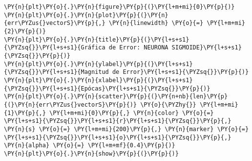     \begin{tcolorbox}[breakable, size=fbox, boxrule=1pt, pad at break*=1mm,colback=cellbackground, colframe=cellborder]
\begin{Verbatim}[commandchars=\\\{\}]
\PY{n}{plt}\PY{o}{.}\PY{n}{figure}\PY{p}{(}\PY{l+m+mi}{0}\PY{p}{)}
\PY{n}{plt}\PY{o}{.}\PY{n}{plot}\PY{p}{(}\PY{n}{err\PYZus{}vectorS}\PY{p}{,} \PY{n}{linewidth} \PY{o}{=} \PY{l+m+mi}{2}\PY{p}{)}
\PY{n}{plt}\PY{o}{.}\PY{n}{title}\PY{p}{(}\PY{l+s+s1}{\PYZsq{}}\PY{l+s+s1}{Gráfica de Error: NEURONA SIGMOIDE}\PY{l+s+s1}{\PYZsq{}}\PY{p}{)}
\PY{n}{plt}\PY{o}{.}\PY{n}{ylabel}\PY{p}{(}\PY{l+s+s1}{\PYZsq{}}\PY{l+s+s1}{Magnitud de Error}\PY{l+s+s1}{\PYZsq{}}\PY{p}{)}
\PY{n}{plt}\PY{o}{.}\PY{n}{xlabel}\PY{p}{(}\PY{l+s+s1}{\PYZsq{}}\PY{l+s+s1}{Epócas}\PY{l+s+s1}{\PYZsq{}}\PY{p}{)}
\PY{n}{plt}\PY{o}{.}\PY{n}{scatter}\PY{p}{(}\PY{n+nb}{len}\PY{p}{(}\PY{n}{err\PYZus{}vectorS}\PY{p}{)} \PY{o}{\PYZhy{}} \PY{l+m+mi}{1}\PY{p}{,} \PY{l+m+mi}{0}\PY{p}{,} \PY{n}{color} \PY{o}{=} \PY{l+s+s1}{\PYZsq{}}\PY{l+s+s1}{r}\PY{l+s+s1}{\PYZsq{}}\PY{p}{,} \PY{n}{s} \PY{o}{=} \PY{l+m+mi}{200}\PY{p}{,} \PY{n}{marker} \PY{o}{=} \PY{l+s+s1}{\PYZsq{}}\PY{l+s+s1}{o}\PY{l+s+s1}{\PYZsq{}}\PY{p}{,} \PY{n}{alpha} \PY{o}{=} \PY{l+m+mf}{0.4}\PY{p}{)}
\PY{n}{plt}\PY{o}{.}\PY{n}{show}\PY{p}{(}\PY{p}{)}
\end{Verbatim}
\end{tcolorbox}

    \begin{center}
    \end{center}
    { \hspace*{\fill} \\}
    
